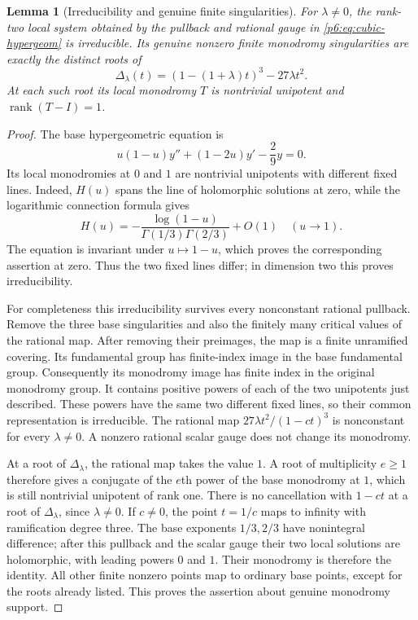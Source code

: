 \documentclass[11pt,a4paper]{article}
\newtheorem{lemma}[theorem]{Lemma}
\theoremstyle{definition}
\theoremstyle{remark}
\numberwithin{equation}{section}
\begin{document}
\begin{lemma}[Irreducibility and genuine finite singularities]
\label{p6:lem:cubic-monodromy}
For $\lambda\ne0$, the rank-two local system obtained by the pullback
and rational gauge in \eqref{p6:eq:cubic-hypergeom} is irreducible.
Its genuine nonzero finite monodromy singularities are exactly the
distinct roots of
\begin{equation}
\label{p6:eq:cubic-Delta}
 \Delta_\lambda(t)=(1-(1+\lambda)t)^3-27\lambda t^2.
\end{equation}
At each such root its local monodromy $T$ is nontrivial unipotent and
$\operatorname{rank}(T-I)=1$.
\end{lemma}
\begin{proof}
The base hypergeometric equation is
\[
 u(1-u)y''+(1-2u)y'-\frac29y=0.
\]
Its local monodromies at $0$ and $1$ are nontrivial unipotents with
different fixed lines. Indeed, $H(u)$ spans the line of holomorphic
solutions at zero, while the logarithmic connection formula
\cite[\S15.8.10]{p6:DLMF} gives
\[
 H(u)=-\frac{\log(1-u)}{\Gamma(1/3)\Gamma(2/3)}+O(1)
 \quad (u\longrightarrow1).
\]
The equation is invariant under $u\mapsto1-u$, which proves the
corresponding assertion at zero. Thus the two fixed lines differ;
in dimension two this proves irreducibility.

For completeness this irreducibility survives every nonconstant
rational pullback. Remove the three base singularities and also the
finitely many critical values of the rational map. After removing their
preimages, the map is a finite unramified covering. Its fundamental
group has finite-index image in the base fundamental group. Consequently
its monodromy image has finite index in the original monodromy group.
It contains positive powers of each of the two unipotents just described.
These powers have the same two different fixed lines, so their common
representation is irreducible. The rational map
$27\lambda t^2/(1-ct)^3$ is nonconstant for every $\lambda\ne0$.
A nonzero rational scalar gauge does not change its monodromy.

At a root of $\Delta_\lambda$, the rational map takes the value $1$.
A root of multiplicity $e\geq1$ therefore gives a conjugate of the
$e$th power of the base monodromy at $1$, which is still nontrivial
unipotent of rank one. There is no cancellation with $1-ct$ at a root
of $\Delta_\lambda$, since $\lambda\ne0$.
If $c\ne0$, the point $t=1/c$ maps to infinity with ramification degree
three. The base exponents $1/3,2/3$ have nonintegral difference;
after this pullback and the scalar gauge their two local solutions
are holomorphic, with leading powers $0$ and $1$. Their monodromy
is therefore the identity. All other finite nonzero points map to
ordinary base points, except for the roots already listed. This proves
the assertion about genuine monodromy support.
\end{proof}
\end{document}
